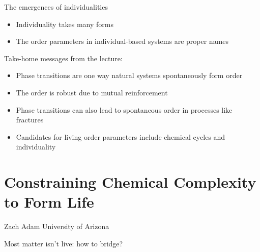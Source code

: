 \documentclass[]{article}
\begin{document}
The emergences of individualities
\begin{itemize}
	\item Individuality takes many 	forms
	\item The order parameters in individual-based systems 	are proper names
\end{itemize}

Take-home messages from the lecture:
\begin{itemize}
	\item Phase transitions are one way natural systems  spontaneously form order
	\item The order is robust due to mutual reinforcement
	\item Phase transitions can also lead to spontaneous order in processes like fractures
	\item Candidates for living order parameters include chemical cycles and individuality
\end{itemize}

\section{Constraining Chemical Complexity to Form Life}

Zach Adam
University of Arizona

Most matter isn't live: how to bridge?
\end{document}
